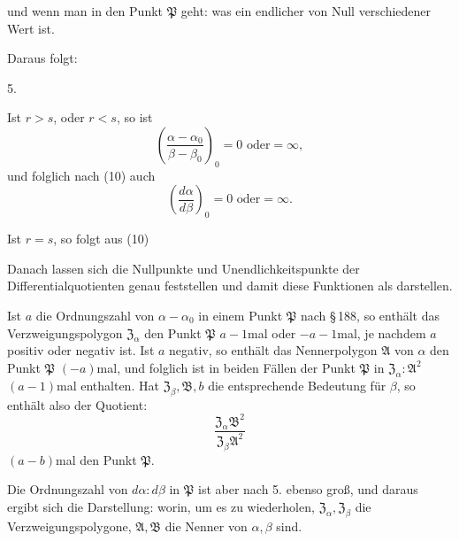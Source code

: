 und wenn man in den Punkt $\mathfrak{P}$ geht:
was ein endlicher von Null verschiedener Wert ist.

Daraus folgt:

5. 

Ist $r > s$, oder $r < s$, so ist
\[
\left(\frac{\alpha-\alpha_0}{\beta-\beta_0}\right)_0 = 0 \text{ oder} = \infty,
\]
und folglich nach (10) auch
\[
\left(\frac{d\alpha}{d\beta}\right)_0 = 0 \text{ oder} = \infty.
\]

Ist $r = s$, so folgt aus (10)


Danach lassen sich die Nullpunkte und Unendlichkeitspunkte der Differentialquotienten genau feststellen und damit diese Funktionen als  darstellen.

Ist $a$ die Ordnungszahl von $\alpha - \alpha_0$ in einem Punkt $\mathfrak{P}$ nach \S\,188, so enthält das Verzweigungspolygon $\mathfrak{Z}_\alpha$ den Punkt $\mathfrak{P}$ $a - 1$mal oder $-a-1$mal, je nachdem $a$ positiv oder negativ ist. Ist $a$ negativ, so enthält das Nennerpolygon $\mathfrak{A}$ von $\alpha$ den Punkt $\mathfrak{P}$ $(-a)$mal, und folglich ist in beiden Fällen der Punkt $\mathfrak{P}$ in $\mathfrak{Z}_\alpha : \mathfrak{A}^2$ $(a-1)$mal enthalten. Hat $\mathfrak{Z}_\beta, \mathfrak{B}, b$ die entsprechende Bedeutung für $\beta$, so enthält also der Quotient:
\[
\frac{\mathfrak{Z}_\alpha \mathfrak{B}^2}{\mathfrak{Z}_\beta \mathfrak{A}^2}
\]
$(a-b)$mal den Punkt $\mathfrak{P}$.

Die Ordnungszahl von $d\alpha : d\beta$ in $\mathfrak{P}$ ist aber nach 5. ebenso groß, und daraus ergibt sich die Darstellung:
worin, um es zu wiederholen, $\mathfrak{Z}_\alpha, \mathfrak{Z}_\beta$ die Verzweigungspolygone, $\mathfrak{A}, \mathfrak{B}$ die Nenner von $\alpha, \beta$ sind.
